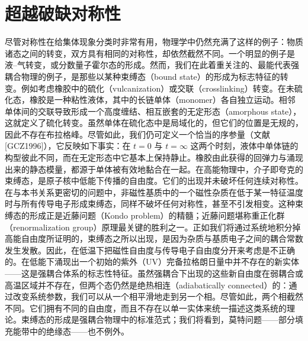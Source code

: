 \section{超越破缺对称性}

尽管对称性在给集体现象分类时非常有用，物理学中仍然充满了这样的例子：物质诸态之间的转变，双方具有相同的对称性，却依然截然不同。一个明显的例子是液–气转变，或分数量子霍尔态的形成。然而，我们在此着重关注的、最能代表强耦合物理的例子，是那些以某种束缚态（bound state）的形成为标志特征的转变。例如考虑橡胶中的硫化（vulcanization）或交联（crosslinking）转变。在未硫化态，橡胶是一种粘性液体，其中的长链单体（monomer）各自独立运动。相邻单体间的交联导致形成一个高度缠结、相互嵌套的无定形态（amorphous state），这就定义了硫化转变。虽然单体在硫化态中是局域化的，但它们的位置是无规的，因此不存在布拉格峰。尽管如此，我们仍可定义一个恰当的序参量（文献 [GCZ1996]），它反映如下事实：在 $t=0$ 与 $t=\infty$ 这两个时刻，液体中单体链的构型彼此不同，而在无定形态中它基本上保持静止。橡胶由此获得的回弹力与涌现出来的静态模量，都源于单体被有效地黏合在一起。在高能物理中，介子即夸克的束缚态，是原子核中低能下传播的自由度。它们的出现并未破坏任何连续对称性。在与本书关系更密切的问题中，非磁性基质中的一个磁性杂质在低于某一特征温度时与所有传导电子形成束缚态，同样不破坏任何对称性，甚至不引发相变。这种束缚态的形成正是近藤问题（Kondo problem）的精髓；近藤问题堪称重正化群（renormalization group）原理最关键的胜利之一。正如我们将通过系统地积分掉高能自由度所证明的，束缚态之所以出现，是因为杂质与基质电子之间的耦合常数发生发散。因此，在低温下把磁性自由度与传导电子自由度分开来考虑是不正确的。在低能下涌现出一个初始的紫外（UV）完备拉格朗日量中并不存在的新实体——这是强耦合体系的标志性特征。虽然强耦合下出现的这些新自由度在弱耦合或高温区域并不存在，但两个态仍然是绝热相连（adiabatically connected）的：通过改变系统参数，我们可以从一个相平滑地走到另一个相。尽管如此，两个相截然不同。它们拥有不同的自由度，而且不存在以单一实体来统一描述这类系统的理论。束缚态的形成是强耦合物理中的标准范式；我们将看到，莫特问题——部分填充能带中的绝缘态——也不例外。

